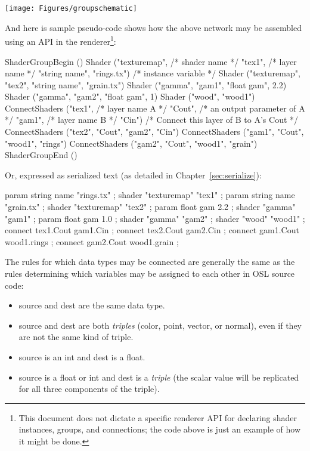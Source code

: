 \documentclass[11pt,letterpaper]{book}
\def\color{{\cf color}\xspace}
\def\normal{{\cf normal}\xspace}
\def\point{{\cf point}\xspace}
\def\vector{{\cf vector}\xspace}
\begin{document}
\noindent \texttt{[image: Figures/groupschematic]}

\bigskip

\noindent And here is sample pseudo-code shows how the above network may
be assembled using an API in the renderer\footnote{This document does
not dictate a specific renderer API for declaring shader instances,
groups, and connections; the code above is just an example of how
it might be done.}:

\begin{code}
    ShaderGroupBegin ()
    Shader ("texturemap",               /* shader name */
            "tex1",                     /* layer name */
            "string name", "rings.tx")  /* instance variable */
    Shader ("texturemap", "tex2", "string name", "grain.tx")
    Shader ("gamma", "gam1", "float gam", 2.2)
    Shader ("gamma", "gam2", "float gam", 1)
    Shader ("wood", "wood1")
    ConnectShaders ("tex1",     /* layer name A */
                    "Cout",     /* an output parameter of A */
                    "gam1",     /* layer name B */
                    "Cin")      /* Connect this layer of B to A's Cout */
    ConnectShaders ("tex2", "Cout", "gam2", "Cin")
    ConnectShaders ("gam1", "Cout", "wood1", "rings")
    ConnectShaders ("gam2", "Cout", "wood1", "grain")
    ShaderGroupEnd ()
\end{code}

\noindent Or, expressed as serialized text (as detailed in
Chapter~\ref{sec:serialize}):

\begin{code}
    param string name "rings.tx" ;
    shader "texturemap" "tex1" ;
    param string name "grain.tx" ;
    shader "texturemap" "tex2" ;
    param float gam 2.2 ;
    shader "gamma" "gam1" ;
    param float gam 1.0 ;
    shader "gamma" "gam2" ;
    shader "wood" "wood1" ;
    connect tex1.Cout gam1.Cin ;
    connect tex2.Cout gam2.Cin ;
    connect gam1.Cout wood1.rings ;
    connect gam2.Cout wood1.grain ;
\end{code}

The rules for which data types may be connected are generally the same as
the rules determining which variables may be assigned to each other in OSL
source code:
\begin{itemize}
\item {\cf source} and {\cf dest} are the same data type.
\item {\cf source} and {\cf dest} are both \emph{triples} (\color, \point,
\vector, or \normal), even if they are not the same kind of triple.
\item {\cf source} is an {\cf int} and {\cf dest} is a {\cf float}.
\item {\cf source} is a {\cf float} or {\cf int} and {\cf dest} is a
\emph{triple} (the scalar value will be replicated for all three components
of the triple).
\end{itemize}
\end{document}
